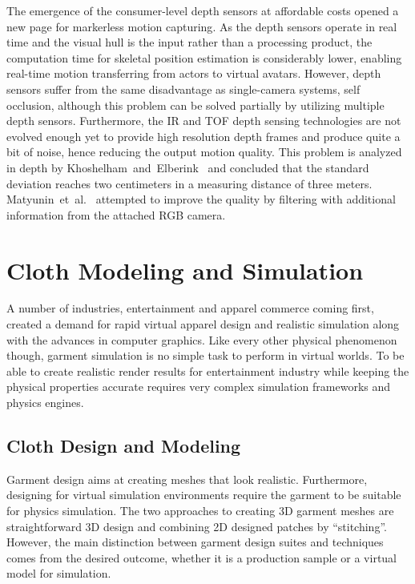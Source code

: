  The emergence of the consumer-level depth sensors at affordable costs opened a new page for markerless motion capturing\cite{Dutta2012}. As the depth sensors operate in real time  and the visual hull is the input rather than a processing product, the computation time for skeletal position estimation is considerably lower, enabling  real-time motion transferring from actors to virtual avatars. However, depth sensors suffer from the same disadvantage as single-camera systems, self occlusion, although this problem can be solved partially by utilizing multiple depth sensors\cite{Berger2011}. Furthermore, the IR and TOF depth sensing technologies are not evolved enough yet to provide high resolution depth frames and produce quite a bit of noise, hence reducing the output motion quality. This problem is analyzed in depth by Khoshelham~and~Elberink~\cite{Khoshelham2012} and concluded that the standard deviation reaches two centimeters in a measuring distance of three meters. Matyunin~et~al.~\cite{Matyunin2011} attempted to improve the 
quality by filtering with additional information from the attached RGB camera.   
 
\section{Cloth Modeling and Simulation}
 
A number of industries, entertainment and apparel commerce coming first, created a demand for rapid virtual apparel design and realistic simulation along with the advances in computer graphics. Like every other physical phenomenon though, garment simulation is no simple task to perform in virtual worlds. To be able to create realistic render results for entertainment industry while keeping the physical properties accurate requires very complex simulation frameworks and physics engines. 
 
\subsection{Cloth Design and Modeling}
 
Garment design aims at creating meshes that look realistic. Furthermore, designing for virtual simulation environments require the garment to be suitable for physics simulation. The two approaches to creating 3D garment meshes are straightforward 3D design and combining 2D designed patches by ``stitching''. However, the main distinction between garment design suites and techniques comes from the desired outcome, whether it is a production sample or a virtual model for simulation.
 
